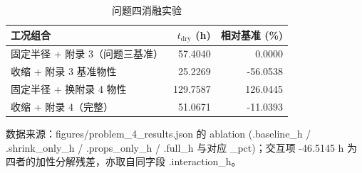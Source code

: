 \begin{table}[H]
  \centering
  \caption{问题四消融实验}
  \label{tab:ablation}
  \begin{tabular}{lrr}
    \toprule
    工况组合 & $t_{\mathrm{dry}}$ (h) & 相对基准 (\%) \\
    \midrule
    固定半径 + 附录 3（问题三基准） & 57.4040 & 0.0000 \\
    收缩 + 附录 3 基准物性 & 25.2269 & -56.0538 \\
    固定半径 + 换附录 4 物性 & 129.7587 & 126.0445 \\
    收缩 + 附录 4（完整） & 51.0671 & -11.0393 \\
    \bottomrule
  \end{tabular}
  \par\vspace{2pt}\footnotesize 数据来源：figures/problem\_4\_results.json 的 ablation (.baseline\_h / .shrink\_only\_h / .props\_only\_h / .full\_h 与对应 \_pct)；交互项 -46.5145 h 为四者的加性分解残差，亦取自同字段 .interaction\_h。
\end{table}
